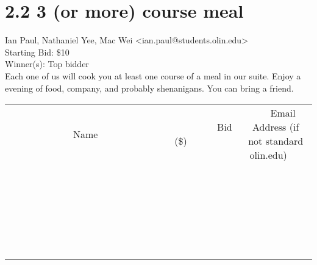 \documentclass[11pt]{article}
\begin{document}
					\section*{2.2 3 (or more) course meal}
					Ian Paul, Nathaniel Yee, Mac Wei <ian.paul@students.olin.edu> \\
					Starting Bid: \$10 \\
					Winner(s): Top bidder \\
					Each one of us will cook you at least one course of a meal in our suite. Enjoy a evening of food, company, and probably shenanigans. You can bring a friend. \\
					[6ex]
					\begin{tabular}{c c c}
						~~~~~~~~~~~~~Name~~~~~~~~~~~~~ & ~~~~~~~~~Bid (\$)~~~~~~~~~ & ~~~Email Address (if not standard olin.edu)~~~ \\
				
 & & \\
\hline
 & & \\
\hline
 & & \\
\hline
 & & \\
\hline
 & & \\
\hline
 & & \\
\hline
 & & \\
\hline
 & & \\
\hline
 & & \\
\hline
 & & \\
\hline
 & & \\
\hline
 & & \\
\hline
 & & \\
\hline
 & & \\
\hline
 & & \\
\hline
 & & \\
\hline
 & & \\
\hline
 & & \\
\hline
 & & \\
\hline
 & & \\
\hline
 & & \\
\hline
 & & \\
\hline
 & & \\
\hline
 & & \\
\hline
 & & \\
\hline
 & & \\
\hline
					\end{tabular}
					\clearpage
				
\end{document}
